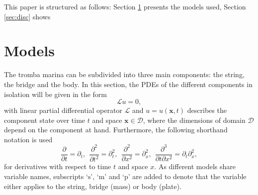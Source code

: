 \documentclass[dvipsnames]{article}
\begin{document}
This paper is structured as follows: Section \ref{sec:models} presents the models used, Section \ref{sec:disc} shows 

\section{Models}\label{sec:models}
The tromba marina can be subdivided into three main components: the string, the bridge and the body. In this section, the PDEs of the different components in isolation will be given in the form
\begin{equation}\label{eq:PDEform}
    \mathcal{L}u = 0,
\end{equation}
with linear partial differential operator $\mathcal{L}$ and $u = u(\boldsymbol{x},t)$ describes the component state over time $t$ and space $\boldsymbol{x}\in\mathcal{D}$, where the dimensions of domain $\mathcal{D}$ depend on the component at hand. Furthermore, the following shorthand notation is used
\begin{equation}
     \frac{\partial}{\partial t} = \partial_t, \ \ \frac{\partial^2}{\partial t^2} = \partial^2_t, \ \ \frac{\partial^2}{\partial x^2} = \partial^2_x,\ \ \frac{\partial^3}{\partial t\partial x^2} = \partial_t\partial^2_x,
\end{equation}
for derivatives with respect to time $t$ and space $x$. As different models share variable names, subscripts `$\text{s}$', `$\text{m}$' and `$\text{p}$' are added to denote that the variable either applies to the string, bridge (mass) or body (plate).
\end{document}
